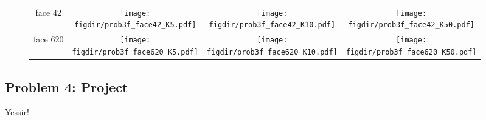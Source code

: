 \documentclass[twoside,11pt]{article}
\newcommand{\figdir}{figs}
\theoremstyle{definition}
\begin{document}
\begin{enumerate}[(a)]
\begin{figure}[h!]
\begin{tabular}{cccc}
face 42 & \texttt{[image: \\figdir/prob3f\_face42\_K5.pdf]} &
\texttt{[image: \\figdir/prob3f\_face42\_K10.pdf]} &
\texttt{[image: \\figdir/prob3f\_face42\_K50.pdf]} \\

face 620 &
\texttt{[image: \\figdir/prob3f\_face620\_K5.pdf]} &
\texttt{[image: \\figdir/prob3f\_face620\_K10.pdf]} &
\texttt{[image: \\figdir/prob3f\_face620\_K50.pdf]} \\
\end{tabular}
\end{figure}

\end{enumerate}


\subsection*{Problem 4: Project}

Yessir!
\end{document}
